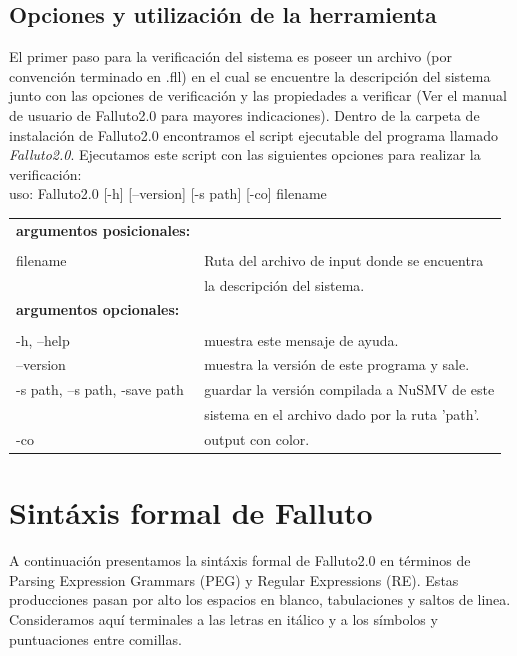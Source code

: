 \documentclass[titlepage, 12pt]{book}
\begin{document}
\section{Opciones y utilizaci\'on de la herramienta}
El primer paso para la verificaci\'on del sistema es poseer un archivo (por convenci\'on terminado en .fll) en el cual se encuentre la descripci\'on del sistema junto con las opciones de verificaci\'on y las propiedades a verificar (Ver el manual de usuario de Falluto2.0 para mayores indicaciones). Dentro de la carpeta de instalaci\'on de Falluto2.0 encontramos el script ejecutable del programa llamado \textit{Falluto2.0}. Ejecutamos este script con las siguientes opciones para realizar la verificaci\'on:\\


\noindent uso: Falluto2.0 [-h] [--version] [-s path] [-co] filename\\


\begin{tabular}{ll}
\textbf{argumentos posicionales:}\\\\
filename & Ruta del archivo de input donde se encuentra \\
         & la descripci\'on del sistema.\\
\textbf{argumentos opcionales:} & \\\\
-h, --help          & muestra este mensaje de ayuda.\\
--version           & muestra la versi\'on de este programa y sale.\\
-s path, --s path, -save path & guardar la versi\'on compilada a NuSMV de este \\
                              & sistema en el archivo dado por la ruta 'path'.\\
-co 		        & output con color.\\
\end{tabular}





\chapter{Sint\'axis formal de Falluto}
\label{sintaxisFormal}

A continuaci\'on presentamos la sint\'axis formal de Falluto2.0 en t\'erminos de Parsing Expression Grammars (PEG) y Regular Expressions (RE). Estas producciones pasan por alto los espacios en blanco, tabulaciones y saltos de linea. Consideramos aqu\'i terminales a las letras en it\'alico y a los s\'imbolos y puntuaciones entre comillas.
\end{document}
